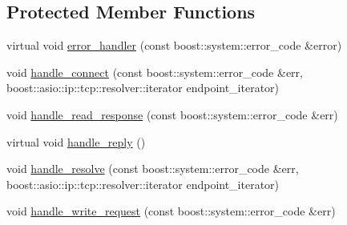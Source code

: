 \subsection*{Protected Member Functions}
\begin{DoxyCompactItemize}
\item 
virtual void \hyperlink{classrapp_1_1services_1_1asio__service__raw_a96fe160b9973c6316df16d0ec2939104}{error\-\_\-handler} (const boost\-::system\-::error\-\_\-code \&error)
\item 
void \hyperlink{classrapp_1_1services_1_1asio__service__raw_a8be2c6ac66884d8d3f3779c2c70651c1}{handle\-\_\-connect} (const boost\-::system\-::error\-\_\-code \&err, boost\-::asio\-::ip\-::tcp\-::resolver\-::iterator endpoint\-\_\-iterator)
\item 
void \hyperlink{classrapp_1_1services_1_1asio__service__raw_a053752763ff279a21718da71b317aa6f}{handle\-\_\-read\-\_\-response} (const boost\-::system\-::error\-\_\-code \&err)
\item 
virtual void \hyperlink{classrapp_1_1services_1_1asio__service__raw_a16180f18d857607b862e5a63793e8faf}{handle\-\_\-reply} ()
\item 
void \hyperlink{classrapp_1_1services_1_1asio__service__raw_afe3816c68db5367968f237e863b5ecb4}{handle\-\_\-resolve} (const boost\-::system\-::error\-\_\-code \&err, boost\-::asio\-::ip\-::tcp\-::resolver\-::iterator endpoint\-\_\-iterator)
\item 
void \hyperlink{classrapp_1_1services_1_1asio__service__raw_a44819785fc02d1583d2325ea4ddfd93d}{handle\-\_\-write\-\_\-request} (const boost\-::system\-::error\-\_\-code \&err)
\end{DoxyCompactItemize}

